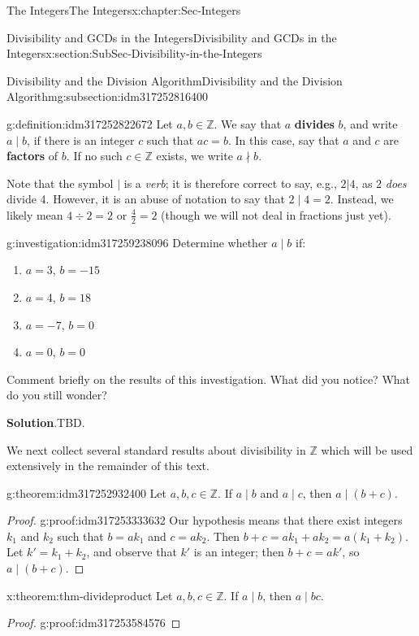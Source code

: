 \documentclass[oneside,10pt,]{book}
\newcommand{\blocktitlefont}{\relax}
\newcommand{\terminology}[1]{\textbf{#1}}
\numberwithin{equation}{section}
\def\Z{{\mathbb Z}}
\begin{document}
\begin{chapterptx}{The Integers}{}{The Integers}{}{}{x:chapter:Sec-Integers}
\begin{sectionptx}{Divisibility and GCDs in the Integers}{}{Divisibility and GCDs in the Integers}{}{}{x:section:SubSec-Divisibility-in-the-Integers}
\begin{subsectionptx}{Divisibility and the Division Algorithm}{}{Divisibility and the Division Algorithm}{}{}{g:subsection:idm317252816400}
\begin{definition}{}{g:definition:idm317252822672}%
%
%
Let \(a,b\in \Z\). We say that \(a\) \terminology{divides} \(b\), and write \(a\mid b\), if there is an integer \(c\) such that \(ac = b\). In this case, say that \(a\) and \(c\) are \terminology{factors} of \(b\). If no such \(c\in \Z\) exists, we write \(a\nmid b\).%
\end{definition}
Note that the symbol \(|\) is a \emph{verb}; it is therefore correct to say, e.g., \(2|4\), as 2 \emph{does} divide 4. However, it is an abuse of notation to say that \(2\mid 4 = 2\). Instead, we likely mean \(4\div 2 = 2\) or \(\frac{4}{2} = 2\) (though we will not deal in fractions just yet).%
\begin{investigation}{}{g:investigation:idm317259238096}%
Determine whether \(a\mid b\) if:%
\begin{enumerate}
\item{}\(a = 3\), \(b = -15\)%
\item{}\(a = 4\), \(b = 18\)%
\item{}\(a = -7\), \(b = 0\)%
\item{}\(a = 0\), \(b = 0\)%
\end{enumerate}
Comment briefly on the results of this investigation. What did you notice? What do you still wonder?%
\par\smallskip%
\noindent\textbf{\blocktitlefont Solution}.\hypertarget{g:solution:idm317253050544}{}\quad{}TBD.%
\end{investigation}
We next collect several standard results about divisibility in \(\Z\) which will be used extensively in the remainder of this text.%
\begin{theorem}{}{}{g:theorem:idm317252932400}%
Let \(a,b,c\in\Z\). If \(a\mid b\) and \(a\mid c\), then \(a\mid (b+c)\).%
\end{theorem}
\begin{proof}{}{g:proof:idm317253333632}
Our hypothesis means that there exist integers \(k_1\) and \(k_2\) such that \(b = a k_1\) and \(c = a k_2\). Then \(b+c = a k_1 + a k_2 = a(k_1 + k_2)\). Let \(k' = k_1 + k_2\), and observe that \(k'\) is an integer; then \(b+c = a k'\), so \(a\mid (b+c)\).%
\end{proof}
\begin{theorem}{}{}{x:theorem:thm-divideproduct}%
Let \(a,b,c\in\Z\). If \(a\mid b\), then \(a\mid bc\).%
\end{theorem}
\begin{proof}{}{g:proof:idm317253584576}

\end{proof}
\end{subsectionptx}
\end{sectionptx}
\end{chapterptx}
\end{document}
